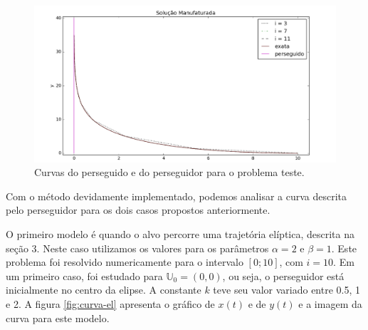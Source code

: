 \documentclass[a4paper,10pt]{article}
\begin{document}
  \begin{figure}[H]
   \includegraphics[width=\textwidth]{manufaturada.png}
   \caption{Curvas do perseguido e do perseguidor para o problema teste.}
   \label{fig:manufaturada}
  \end{figure}

  
  Com o método devidamente implementado, podemos analisar a curva descrita pelo perseguidor para os dois casos propostos anteriormente.
 
  O primeiro modelo é quando o alvo percorre uma trajetória elíptica, descrita na seção 3. Neste caso utilizamos os valores para os parâmetros $\alpha = 2$ e $\beta = 1$. Este problema foi resolvido numericamente para o intervalo $[0; 10]$, com $i = 10$. Em um primeiro caso, foi estudado para $\mathbb{U}_{0} = (0, 0)$, ou seja, o perseguidor está inicialmente no centro da elipse. A constante $k$ teve seu valor variado entre 0.5, 1 e 2. A figura \ref{fig:curva-el} apresenta o gráfico de $x(t)$ e de $y(t)$ e a imagem da curva para este modelo.
  
\end{document}
